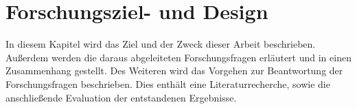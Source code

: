 \chapter{Forschungsziel- und Design}

In diesem Kapitel wird das Ziel und der Zweck dieser Arbeit beschrieben. Außerdem werden die daraus abgeleiteten Forschungsfragen erläutert und in einen Zusammenhang gestellt. Des Weiteren wird das Vorgehen zur Beantwortung der Forschungsfragen beschrieben. Dies enthält eine Literaturrecherche, sowie die anschließende Evaluation der entstandenen Ergebnisse.





